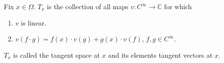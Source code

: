 
Fix $x \in \Omega$. $T_x$ is the collection of all maps $v : C^\infty \to \mathbb{C}$ for which
\begin{enumerate}
\item[(a)] $v$ is linear.
\item[(b)] $v(f \cdot g) = f(x) \cdot v(g) + g(x) \cdot v(f)$, $f, g \in C^\infty$.
\end{enumerate}
$T_x$ is called the tangent space at $x$ and its elements tangent vectors at $x$.
